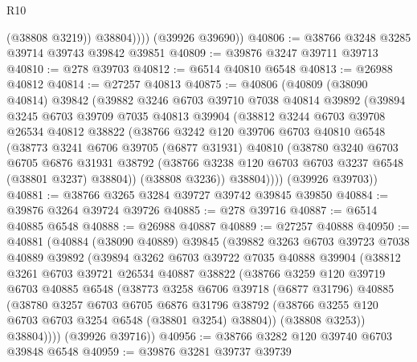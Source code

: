 \begin{lexlean}{R10}
\begin{coremodule}
                (@38808 @3219))
              @38804))))
      (@39926 @39690))
@40806 := @38766 @3248 @3285 @39714 @39743 @39842 @39851
@40809 := @39876 @3247 @39711 @39713
@40810 := @278 @39703
@40812 := @6514 @40810 @6548
@40813 := @26988 @40812
@40814 := @27257 @40813
@40875 := @40806
    (@40809
      (@38090 @40814)
      @39842
      (@39882
        @3246
        @6703
        @39710
        @7038
        @40814
        @39892
        (@39894
          @3245
          @6703
          @39709
          @7035
          @40813
          @39904
          (@38812
            @3244
            @6703
            @39708
            @26534
            @40812
            @38822
            (@38766
              @3242
              @120
              @39706
              @6703
              @40810
              @6548
              (@38773
                @3241
                @6706
                @39705
                (@6877 @31931)
                @40810
                (@38780
                  @3240
                  @6703
                  @6705
                  @6876
                  @31931
                  @38792
                  (@38766 @3238 @120 @6703 @6703 @3237 @6548 (@38801 @3237) @38804))
                (@38808 @3236))
              @38804))))
      (@39926 @39703))
@40881 := @38766 @3265 @3284 @39727 @39742 @39845 @39850
@40884 := @39876 @3264 @39724 @39726
@40885 := @278 @39716
@40887 := @6514 @40885 @6548
@40888 := @26988 @40887
@40889 := @27257 @40888
@40950 := @40881
    (@40884
      (@38090 @40889)
      @39845
      (@39882
        @3263
        @6703
        @39723
        @7038
        @40889
        @39892
        (@39894
          @3262
          @6703
          @39722
          @7035
          @40888
          @39904
          (@38812
            @3261
            @6703
            @39721
            @26534
            @40887
            @38822
            (@38766
              @3259
              @120
              @39719
              @6703
              @40885
              @6548
              (@38773
                @3258
                @6706
                @39718
                (@6877 @31796)
                @40885
                (@38780
                  @3257
                  @6703
                  @6705
                  @6876
                  @31796
                  @38792
                  (@38766 @3255 @120 @6703 @6703 @3254 @6548 (@38801 @3254) @38804))
                (@38808 @3253))
              @38804))))
      (@39926 @39716))
@40956 := @38766 @3282 @120 @39740 @6703 @39848 @6548
@40959 := @39876 @3281 @39737 @39739

\end{coremodule}
\end{lexlean}
